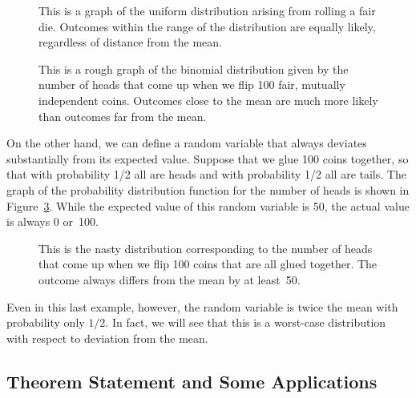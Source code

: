 \begin{editingnotes}
\begin{figure}


\caption{This is a graph of the uniform distribution arising from
  rolling a fair die.  Outcomes within the range of the distribution
  are equally likely, regardless of distance from the mean.}

\label{fig:uniform}

\end{figure}

\begin{figure}


\caption{This is a rough graph of the binomial distribution given by
  the number of heads that come up when we flip 100 fair, mutually
  independent coins.  Outcomes close to the mean are much more
  likely than outcomes far from the mean.}

\label{fig:binom2}

\end{figure}

On the other hand, we can define a random variable that always
deviates substantially from its expected value.  Suppose that we glue
100 coins together, so that with probability 1/2 all are heads and
with probability 1/2 all are tails.  The graph of the probability
distribution function for the number of heads is shown in
Figure~\ref{fig:nasty}.  While the expected value of this random
variable is 50, the actual value is always 0 or~100.

\begin{figure}


\caption{This is the nasty distribution corresponding to the number of
  heads that come up when we flip 100 coins that are all glued
  together. The outcome always differs from the mean by at least~50.}

\label{fig:nasty}

\end{figure}

Even in this last example, however, the random variable is twice the
mean with probability only $1/2$.  In fact, we will see that this is a
worst-case distribution with respect to deviation from the mean.

\subsection{Theorem Statement and Some Applications}

\end{editingnotes}

